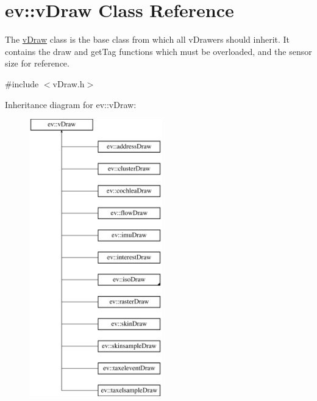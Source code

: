 \hypertarget{classev_1_1vDraw}{}\section{ev\+:\+:v\+Draw Class Reference}
\label{classev_1_1vDraw}


The \hyperlink{classev_1_1vDraw}{v\+Draw} class is the base class from which all v\+Drawers should inherit. It contains the draw and get\+Tag functions which must be overloaded, and the sensor size for reference.  




{\ttfamily \#include $<$v\+Draw.\+h$>$}

Inheritance diagram for ev\+:\+:v\+Draw\+:\begin{figure}[H]
\begin{center}
\leavevmode
\includegraphics[height=12.000000cm]{classev_1_1vDraw}
\end{center}
\end{figure}
